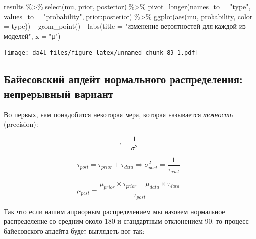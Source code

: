 \documentclass[
]{book}
\newenvironment{Shaded}{\begin{snugshade}}{\end{snugshade}}
\newcommand{\AttributeTok}[1]{\textcolor[rgb]{0.77,0.63,0.00}{#1}}
\newcommand{\FunctionTok}[1]{\textcolor[rgb]{0.00,0.00,0.00}{#1}}
\newcommand{\NormalTok}[1]{#1}
\newcommand{\SpecialCharTok}[1]{\textcolor[rgb]{0.00,0.00,0.00}{#1}}
\newcommand{\StringTok}[1]{\textcolor[rgb]{0.31,0.60,0.02}{#1}}
\begin{document}
\begin{Shaded}
\begin{Highlighting}[]
\NormalTok{results }\SpecialCharTok{\%\textgreater{}\%} 
  \FunctionTok{select}\NormalTok{(mu, prior, posterior) }\SpecialCharTok{\%\textgreater{}\%} 
  \FunctionTok{pivot\_longer}\NormalTok{(}\AttributeTok{names\_to =} \StringTok{"type"}\NormalTok{, }\AttributeTok{values\_to =} \StringTok{"probability"}\NormalTok{, prior}\SpecialCharTok{:}\NormalTok{posterior) }\SpecialCharTok{\%\textgreater{}\%} 
  \FunctionTok{ggplot}\NormalTok{(}\FunctionTok{aes}\NormalTok{(mu, probability, }\AttributeTok{color =}\NormalTok{ type))}\SpecialCharTok{+}
  \FunctionTok{geom\_point}\NormalTok{()}\SpecialCharTok{+}
  \FunctionTok{labs}\NormalTok{(}\AttributeTok{title =} \StringTok{"изменение вероятностей для каждой из моделей"}\NormalTok{,}
       \AttributeTok{x =} \StringTok{"μ"}\NormalTok{)}
\end{Highlighting}
\end{Shaded}

\texttt{[image: da4l\_files/figure-latex/unnamed-chunk-89-1.pdf]}

\hypertarget{ux431ux430ux439ux435ux441ux43eux432ux441ux43aux438ux439-ux430ux43fux434ux435ux439ux442-ux43dux43eux440ux43cux430ux43bux44cux43dux43eux433ux43e-ux440ux430ux441ux43fux440ux435ux434ux435ux43bux435ux43dux438ux44f-ux43dux435ux43fux440ux435ux440ux44bux432ux43dux44bux439-ux432ux430ux440ux438ux430ux43dux442}{%
\subsection{Байесовский апдейт нормального распределения: непрерывный вариант}\label{ux431ux430ux439ux435ux441ux43eux432ux441ux43aux438ux439-ux430ux43fux434ux435ux439ux442-ux43dux43eux440ux43cux430ux43bux44cux43dux43eux433ux43e-ux440ux430ux441ux43fux440ux435ux434ux435ux43bux435ux43dux438ux44f-ux43dux435ux43fux440ux435ux440ux44bux432ux43dux44bux439-ux432ux430ux440ux438ux430ux43dux442}}

Во первых, нам понадобится некоторая мера, которая называется \emph{точность} (precision):

\[\tau = \frac{1}{\sigma^2}\]

\[\tau_{post} = \tau_{prior} + \tau_{data} \Rightarrow \sigma^2_{post} = \frac{1}{\tau_{post}}\]

\[\mu_{post} = \frac{\mu_{prior} \times \tau_{prior} + \mu_{data} \times \tau_{data}}{\tau_{post}}\]

Так что если нашим априорным распределением мы назовем нормальное распределение со средним около 180 и стандартным отклонением 90, то процесс байесовского апдейта будет выглядеть вот так:
\end{document}
